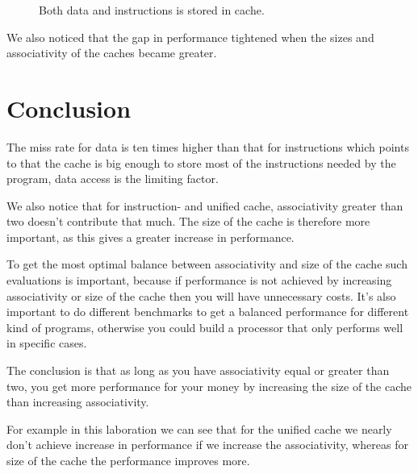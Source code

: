 \documentclass[titlepage, a4paper]{article}
\begin{document}
\begin{figure}[H]
	\centering
	\caption{Both data and instructions is stored in cache.}
	\label{fig:unified-cache}
\end{figure}

We also noticed that the gap in performance tightened when the sizes and associativity of the caches became greater.

\section{Conclusion}
The miss rate for data is ten times higher than that for instructions which points to that the cache is big enough to store most of the instructions needed by the program, data access is the limiting factor.

We also notice that for instruction- and unified cache, associativity greater than two doesn't contribute that much. The size of the cache is therefore more important, as this gives a greater increase in performance.

To get the most optimal balance between associativity and size of the cache such evaluations is important, because if performance is not achieved by increasing associativity or size of the cache then you will have unnecessary costs. It's also important to do different benchmarks to get a balanced performance for different kind of programs, otherwise you could build a processor that only performs well in specific cases.

The conclusion is that as long as you have associativity equal or greater than two, you get more performance for your money by increasing the size of the cache than increasing associativity.

For example in this laboration we can see that for the unified cache we nearly don't achieve increase in performance if we increase the associativity, whereas for size of the cache the performance improves more.
\end{document}
